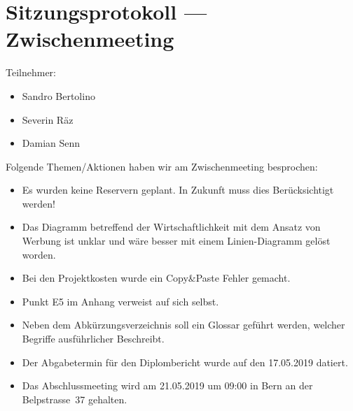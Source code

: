 \chapter{Sitzungsprotokoll --- Zwischenmeeting}

Teilnehmer:

\begin{itemize}
  \tightlist{}
  \item{} Sandro Bertolino
  \item{} Severin Räz
  \item{} Damian Senn
\end{itemize}

\noindent
Folgende Themen/Aktionen haben wir am Zwischenmeeting besprochen:

\begin{itemize}
  \item
        Es wurden keine Reservern geplant. In Zukunft muss dies Berücksichtigt
        werden!
  \item
        Das Diagramm betreffend der Wirtschaftlichkeit mit dem Ansatz von
        Werbung ist unklar und wäre besser mit einem Linien-Diagramm gelöst worden.
  \item
        Bei den Projektkosten wurde ein Copy\&Paste Fehler gemacht.
  \item
        Punkt E5 im Anhang verweist auf sich selbst.
  \item
        Neben dem Abkürzungsverzeichnis soll ein Glossar geführt werden, welcher
        Begriffe ausführlicher Beschreibt.
  \item
        Der Abgabetermin für den Diplombericht wurde auf den 17.05.2019 datiert.
  \item
        Das Abschlussmeeting wird am 21.05.2019 um 09:00 in Bern an der
        Belpstrasse~37 gehalten.
\end{itemize}
